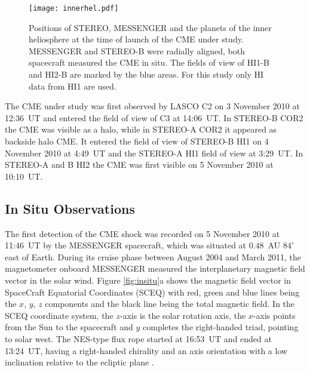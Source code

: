 \documentclass[draft]{agujournal}
\begin{document}
\begin{figure}[h]
\centering
\texttt{[image: innerhel.pdf]}
\caption{Positions of STEREO, MESSENGER and the planets of the inner heliosphere at the time of launch of the CME under study. MESSENGER and STEREO-B were radially aligned, both spacecraft measured the CME in situ. The fields of view of HI1-B and HI2-B are marked by the blue areas. For this study only HI data from HI1 are used.}
\label{fig:innerhel}
\end{figure}

The CME under study was first observed by LASCO C2 on 3 November 2010 at 12:36~UT and  entered the field of view of C3 at 14:06~UT. In STEREO-B COR2 the CME was visible as a halo, while in STEREO-A COR2 it appeared as backside halo CME. It entered the field of view of STEREO-B HI1 on 4 November 2010 at 4:49~UT and the STEREO-A HI1 field of view at 3:29~UT. In STEREO-A and B HI2 the CME was first visible on 5 November 2010 at 10:10~UT.

\subsection{In Situ Observations}

The first detection of the CME shock was recorded on 5 November 2010 at 11:46~UT by the MESSENGER spacecraft, which was situated at $0.48$~AU $84^\circ$ east of Earth.
During its cruise phase between August 2004 and March 2011, the magnetometer onboard MESSENGER \citep[MAG;][]{and07} measured the interplanetary magnetic field vector in the solar wind. Figure \ref{fig:insitu}a shows the magnetic field vector in SpaceCraft Equatorial Coordinates (SCEQ) with red, green and blue lines being the $x$, $y$, $z$ components and the black line being the total magnetic field. In the SCEQ coordinate system, the $z$-axis is the solar rotation axis, the $x$-axis points from the Sun to the spacecraft and $y$ completes the right-handed triad, pointing to solar west. The NES-type flux rope started at 16:53~UT and ended at 13:24~UT, having a right-handed chirality and an axis orientation with a low inclination relative to the ecliptic plane \citep[][]{botsch98}.
\end{document}

